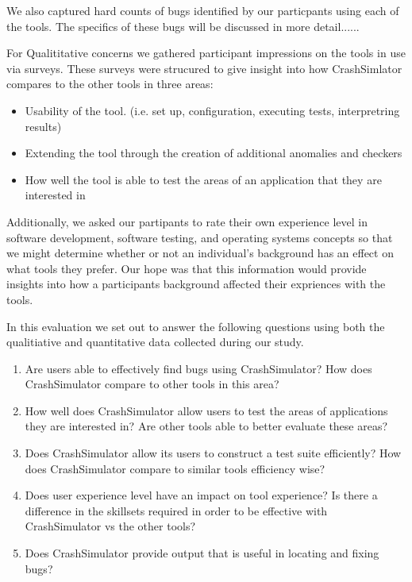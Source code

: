 We also captured hard counts of bugs identified by our particpants using
each of the tools.  The specifics of these bugs will be discussed in more
detail......

For Qualititative concerns we gathered participant impressions on the tools
in use via surveys.  These surveys were strucured to give insight into how
CrashSimlator compares to the other tools in three areas:

\begin{itemize}

\item Usability of the tool. (i.e. set up, configuration, executing tests,
interpretring results)

\item Extending the tool through the creation of additional
anomalies and checkers

\item How well the tool is able to test the areas of an application
that they are interested in

\end{itemize}

Additionally, we asked our partipants to rate their own experience level in
software development, software testing, and operating systems concepts so
that we might determine whether or not an individual's background has an
effect on what tools they prefer.  Our hope was that this information would
provide insights into how a participants background affected their
expriences with the tools.

In this evaluation we set out to answer the following questions using both
the qualitiative and quantitative data collected during our study.

\begin{enumerate}

\item Are users able to effectively find bugs using CrashSimulator?  How
does CrashSimulator compare to other tools in this area?

\item How well does CrashSimulator allow users to test the areas of
applications they are interested in?  Are other tools able to better
evaluate these areas?

\item Does CrashSimulator allow its users to construct a test suite
efficiently?  How does CrashSimulator compare to similar tools
efficiency wise?

\item Does user experience level have an impact on tool experience?  Is
there a difference in the skillsets required in order to be effective
with CrashSimulator vs the other tools?

\item Does CrashSimulator provide output that is useful in locating and
fixing bugs?

\end{enumerate}


